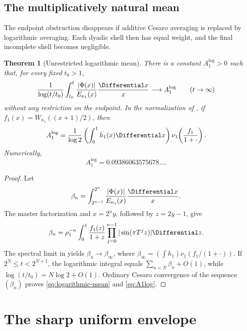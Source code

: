 \documentclass[11pt,oneside]{article}
\newtheorem{theorem}{Theorem}[section]
\theoremstyle{definition}
\theoremstyle{remark}
\begin{document}
\subsection{The multiplicatively natural mean}

The endpoint obstruction disappears if additive Cesaro averaging is replaced by logarithmic
averaging.  Each dyadic shell then has equal weight, and the final incomplete shell becomes
negligible.

\begin{theorem}[Unrestricted logarithmic mean]
\label{thm:logarithmic-mean}
There is a constant $A_1^{\log}>0$ such that, for every fixed $t_0>1$,
\begin{equation}
 \frac1{\log(t/t_0)}\int_{t_0}^t
 \frac{|\Phi(x)|}{E_{\kappa_1}(x)}\frac{\Differential x}{x}
 \longrightarrow A_1^{\log}
 \qquad(t\to\infty)
 \label{eq:logarithmic-mean}
\end{equation}
without any restriction on the endpoint.  In the normalization of
, if
$f_1(x)=W_{\kappa_1}((x+1)/2)$, then
\begin{equation}
 A_1^{\log}=\frac1{\log2}
 \left(\int_0^1h_1(x)\Differential x\right)
 \nu_1\!\left(\frac{f_1}{1+\cdot}\right).
 \label{eq:A1log}
\end{equation}
Numerically,
\begin{equation}
 A_1^{\log}=0.09386063575678\ldots .
 \label{eq:A1log-numeric}
\end{equation}
\end{theorem}

\begin{proof}
Let
\[
 \beta_n=\int_{2^{n-1}}^{2^n}
 \frac{|\Phi(x)|}{E_{\kappa_1}(x)}\frac{\Differential x}{x}.
\]
The master factorization and $x=2^ny$, followed by $z=2y-1$, give
\[
 \beta_n=\rho_1^{-n}\int_0^1
 \frac{f_1(z)}{1+z}\prod_{j=0}^{n-1}|\sin(\pi T^jz)|\Differential z.
\]
The spectral limit in  yields $\beta_n\to\beta_\infty$, where
$\beta_\infty=(\int h_1)\nu_1(f_1/(1+\cdot))$.  If
$2^N\le t<2^{N+1}$, the logarithmic integral equals
$\sum_{n<N}\beta_n+O(1)$, while $\log(t/t_0)=N\log2+O(1)$.  Ordinary Cesaro convergence of
the sequence $(\beta_n)$ proves \eqref{eq:logarithmic-mean} and
\eqref{eq:A1log}.
\end{proof}

\section{The sharp uniform envelope}
\label{sec:uniform}
\end{document}
